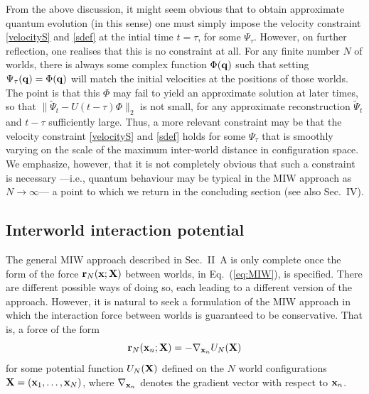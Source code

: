 \documentclass[twocolumn,aps,pra,amsmath,amssymb,superscriptaddress]{revtex4}
\renewcommand{\(}{\left(}
\renewcommand{\)}{\right)}
\newcommand{\red}{\color{red}}
\newcommand{\blk}{\color{black}}
\newcommand{\blu}{\color{blue}}
\renewcommand\blu{\blk}
\renewcommand\red{\blk}
\begin{document}
\red From the above discussion, it might seem obvious that to obtain \blu approximate \red quantum evolution 
(in this sense) one  must \blu simply \red impose the 
velocity constraint \eqref{velocityS} \blu and \red \eqref{sdef} at \blu the intial time \red $t=\tau$, for some $\Psi_\tau$. 
However, on further reflection, one realises that this is no constraint at all. For any 
finite number $N$ of worlds, there is always some complex function $\Phi({\bf q})$ 
such that setting $\Psi_\tau({\bf q}) = \Phi({\bf q})$ will match the initial 
velocities at the positions of those worlds. The point is that this $\Phi$ may fail to yield 
an approximate solution at later times, so that $\|\tilde{\Psi}_t-U(t-\tau){\Phi}\|_2$ 
is not small, for any approximate reconstruction $\tilde{\Psi}_t$ and $t-\tau$ sufficiently 
large. Thus, a more relevant constraint may be that the velocity constraint 
\eqref{velocityS} \blu and \red \eqref{sdef} holds for some $\Psi_\tau$ that is smoothly varying on 
the scale of the maximum inter-world distance in configuration space.  
We emphasize, however, that it is not completely obvious that such a constraint is necessary \blu---i.e., quantum behaviour may be typical in the MIW approach as $N\rightarrow\infty$---\red 
a point to which we return in the concluding section \blu (see also Sec.~IV). \blk 




\subsection{Interworld interaction potential}
\label{sec:class}

The general MIW approach described in Sec.~II~A is only complete once the form of the force ${\bf r}_N({\bf x};{\bf X})$ between worlds, in Eq.~(\ref{eq:MIW}), is specified. There are different possible ways of doing so, each leading to a different version of the approach. \red However, \blk it is natural to seek a formulation of the MIW approach in which the interaction force between worlds is guaranteed to be conservative. That is, a force \blk of the form 
\begin{equation} \label{eq:consforc}
{\bf r}_N({\bf x}_n;{\bf X}) =  -\nabla_{{\bf x}_n} U_N({\bf X})
\end{equation}
for some potential function $U_N({\bf X})$ defined on the $N$ world configurations ${\bf X}=({\bf x}_1,\dots,{\bf x}_N)$, where $\nabla_{{\bf x}_n}$ denotes the gradient vector with respect to ${\bf x}_n$.  
\end{document}
